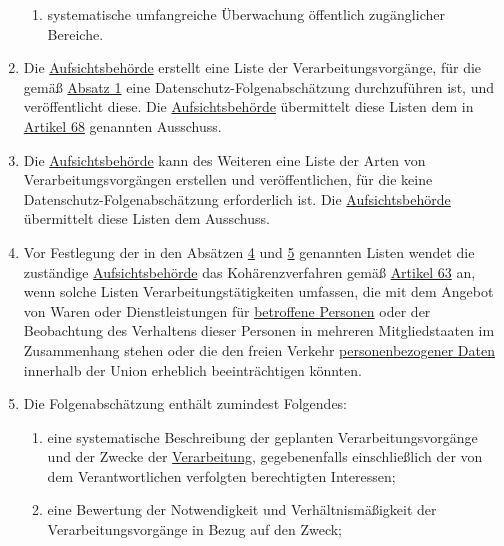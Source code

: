\begin{enumerate}
\begin{enumerate}
    \item systematische umfangreiche Überwachung öffentlich zugänglicher Bereiche.
    \label{itm:35-3c}

  \end{enumerate}

  \item Die \hyperref[itm:04-21]{Aufsichtsbehörde} erstellt eine Liste der Verarbeitungsvorgänge, für die gemäß \hyperref[itm:35-1]{Absatz 1}
   eine Datenschutz-Folgenabschätzung durchzuführen ist, und veröffentlicht diese. Die \hyperref[itm:04-21]{Aufsichtsbehörde} übermittelt
   diese Listen dem in \hyperref[ch:68]{Artikel 68} genannten Ausschuss.
  \label{itm:35-4}

  \item Die \hyperref[itm:04-21]{Aufsichtsbehörde} kann des Weiteren eine Liste der Arten von Verarbeitungsvorgängen erstellen und
   veröffentlichen, für die keine Datenschutz-Folgenabschätzung erforderlich ist. Die \hyperref[itm:04-21]{Aufsichtsbehörde} übermittelt
   diese Listen dem Ausschuss.
  \label{itm:35-5}

  \item Vor Festlegung der in den Absätzen \hyperref[itm:35-4]{4} und \hyperref[itm:35-5]{5} genannten Listen wendet die
   zuständige \hyperref[itm:04-21]{Aufsichtsbehörde} das Kohärenzverfahren gemäß \hyperref[ch:63]{Artikel 63} an, wenn solche Listen
   Verarbeitungstätigkeiten umfassen, die mit dem Angebot von Waren oder Dienstleistungen für \hyperref[itm:04-1]{betroffene Personen} oder
   der Beobachtung des Verhaltens dieser Personen in mehreren Mitgliedstaaten im Zusammenhang stehen oder die den
   freien Verkehr \hyperref[itm:04-1]{personenbezogener Daten} innerhalb der Union erheblich beeinträchtigen könnten.
  \label{itm:35-6}

  \item Die Folgenabschätzung enthält zumindest Folgendes:
  \label{itm:35-7}

  \begin{enumerate}
  
    \item eine systematische Beschreibung der geplanten Verarbeitungsvorgänge und der Zwecke der \hyperref[itm:04-2]{Verarbeitung},
     gegebenenfalls einschließlich der von dem Verantwortlichen verfolgten berechtigten Interessen;
    \label{itm:35-7a}

    \item eine Bewertung der Notwendigkeit und Verhältnismäßigkeit der Verarbeitungsvorgänge in Bezug auf den Zweck;
    \label{itm:35-7b}


\end{enumerate}
\end{enumerate}
